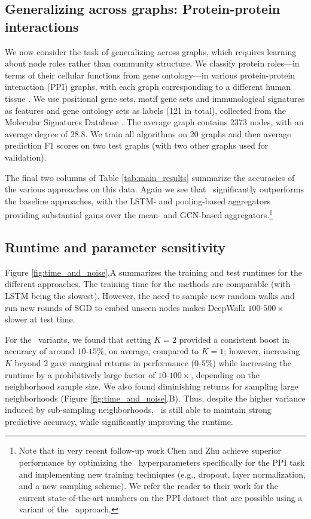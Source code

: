 \subsection{Generalizing across graphs: Protein-protein interactions}\label{sec:ppi}

We now consider the task of generalizing across graphs, which requires learning about node roles rather than community structure. 
We classify protein roles---in terms of their cellular functions from gene ontology---in various
protein-protein interaction (PPI) graphs, with each graph corresponding to a different human tissue \cite{zitnik2017tissue}.
We use positional gene sets, motif gene sets and immunological signatures as features and gene
ontology sets as labels (121 in total), collected from the Molecular Signatures Database \cite{subramanian2005gene}.
The average graph contains 2373 nodes, with an average degree of 28.8.
We train all algorithms on 20 graphs and then average prediction F1 scores on two test graphs (with two other graphs used for validation). 

The final two columns of Table \ref{tab:main_results} summarize the accuracies of the various approaches on this data.
Again we see that \name\ significantly outperforms the baseline approaches, with the LSTM- and pooling-based aggregators providing substantial gains over the mean- and GCN-based aggregators.\footnote{Note that in very recent follow-up work Chen and Zhu \cite{chen2017stochastic} achieve superior performance by optimizing the \name\ hyperparameters specifically for the PPI task and implementing new training techniques (e.g., dropout, layer normalization, and a new sampling scheme). We refer the reader to their work for the current state-of-the-art numbers on the PPI dataset that are possible using a variant of the \name\ approach.} 


\subsection{Runtime and parameter sensitivity}\label{sec:sensitivity}

Figure \ref{fig:time_and_noise}.A summarizes the training and test runtimes for the different approaches. 
The training time for the methods are comparable (with \name-LSTM being the slowest). 
However, the need to sample new random walks and run new rounds of SGD to embed unseen nodes makes DeepWalk $100\text{-}500\times$ slower at test time. 

For the \name\ variants, we found that setting $K=2$ provided a consistent boost in accuracy of around $10\text{-}15\%$, on average, compared
to $K=1$; however, increasing $K$ beyond 2 gave marginal returns in performance ($0\text{-}5\%$)
while increasing the runtime by a prohibitively large factor of $10\text{-}100{\times}$, depending
on the neighborhood sample size.
We also found diminishing returns for sampling large neighborhoods (Figure
\ref{fig:time_and_noise}.B).
Thus, despite
the higher variance induced by sub-sampling neighborhoods, \name\ is still able to maintain strong predictive accuracy, while significantly improving the runtime. 

